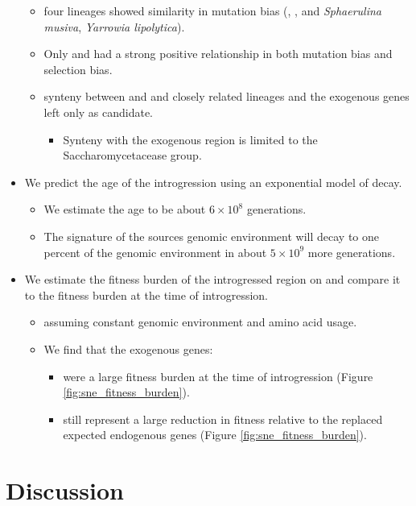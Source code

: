 \documentclass[12pt]{article}
\begin{document}
\begin{itemize}
\begin{itemize}
		\item four lineages showed similarity in mutation bias (\gossypii, \dubl, and \textit{Sphaerulina musiva}, \textit{Yarrowia lipolytica}).
		\item Only \gossypii and \dubl had a strong positive relationship in both mutation bias and selection bias. 
		\item synteny between \gossypii and \dubl and closely related lineages and the exogenous genes left only \gossypii as candidate.
		\begin{itemize}
			\item Synteny with the exogenous region is limited to the Saccharomycetacease group.
		\end{itemize}
	\end{itemize}
	\item We predict the age of the introgression using an exponential model of decay.
	\begin{itemize}
		\item We estimate the age to be about $6\times10^8$ generations.
		\item The signature of the sources genomic environment will decay to one percent of the \kluyveri genomic environment in about $5\times10^9$ more generations.
	\end{itemize}
	\item We estimate the fitness burden of the introgressed region on \kluyveri and compare it to the fitness burden at the time of introgression.
	\begin{itemize}	
		\item assuming constant \gossypii genomic environment and amino acid usage. 
		\item We find that the exogenous genes:
		\begin{itemize}
 			\item were a large fitness burden at the time of introgression (Figure \ref{fig:sne_fitness_burden}).
			\item still represent a large reduction in fitness relative to the replaced expected endogenous genes (Figure \ref{fig:sne_fitness_burden}).
		\end{itemize}
	\end{itemize} 
\end{itemize}

\section*{Discussion}
\end{document}

